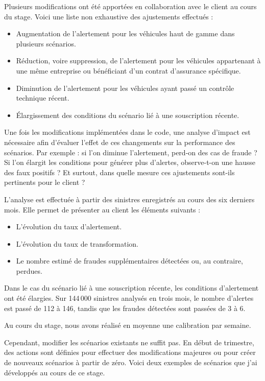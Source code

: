 \documentclass [twoside,openright,a4paper,11pt,french] {report}
\begin{document}
Plusieurs modifications ont été apportées en collaboration avec le client au cours du 
stage. Voici une liste non exhaustive des ajustements effectués :

\begin{itemize}
    \item Augmentation de l'alertement pour les véhicules haut de gamme dans plusieurs 
          scénarios.
    \item Réduction, voire suppression, de l'alertement pour les véhicules appartenant 
          à une même entreprise ou bénéficiant d'un contrat d'assurance spécifique.
    \item Diminution de l'alertement pour les véhicules ayant passé un contrôle 
          technique récent.
    \item Élargissement des conditions du scénario lié à une souscription récente.
\end{itemize}

Une fois les modifications implémentées dans le code, une analyse d'impact est 
nécessaire afin d'évaluer l'effet de ces changements sur la performance des 
scénarios. Par exemple : si l'on diminue l'alertement, perd-on des cas de fraude ? 
Si l'on élargit les conditions pour générer plus d'alertes, observe-t-on une hausse 
des faux positifs ? Et surtout, dans quelle mesure ces ajustements sont-ils 
pertinents pour le client ?

L'analyse est effectuée à partir des sinistres enregistrés au cours des six derniers 
mois. Elle permet de présenter au client les éléments suivants :

\begin{itemize}
    \item L'évolution du taux d'alertement.
    \item L'évolution du taux de transformation.
    \item Le nombre estimé de fraudes supplémentaires détectées ou, au contraire, 
          perdues.
\end{itemize}

Dans le cas du scénario lié à une souscription récente, les conditions d'alertement 
ont été élargies. Sur 144\,000 sinistres analysés en trois mois, le nombre d'alertes 
est passé de 112 à 146, tandis que les fraudes détectées sont passées de 3 à 6.

Au cours du stage, nous avons réalisé en moyenne une calibration par semaine.

Cependant, modifier les scénarios existants ne suffit pas. En début de trimestre, 
des actions sont définies pour effectuer des modifications majeures ou pour créer de 
nouveaux scénarios à partir de zéro. Voici deux exemples de scénarios que j'ai 
développés au cours de ce stage.
\end{document}
